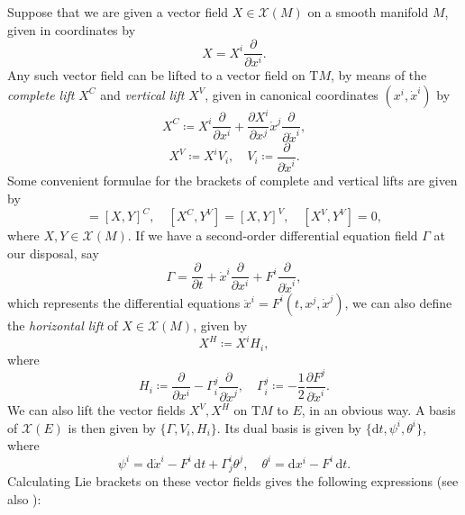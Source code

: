 \documentclass[11pt]{article}
\theoremstyle{plain}
\theoremstyle{definition}
\begin{document}
Suppose that we are given a vector field $X\in \mathcal{X}(M)$ on a smooth manifold $M$, given in coordinates by
\begin{equation*}
    X=X^i \frac{\partial}{\partial x^i}.
\end{equation*}
Any such vector field can be lifted to a vector field on $\mathrm{T}M$, by means of the \emph{complete lift} $X^C$ and \emph{vertical lift} $X^V$, given in canonical coordinates $(x^i,\dot{x}^i)$ by
\begin{equation*}
    X^C\coloneqq X^i \frac{\partial}{\partial x^i}+\frac{\partial X^i}{\partial x^j}\dot{x}^j\frac{\partial}{\partial \dot{x}^i},
\end{equation*}
\begin{equation*}
    X^V\coloneqq X^i V_i,\quad V_i\coloneqq \frac{\partial}{\partial \dot{x}^i}.
\end{equation*}
Some convenient formulae for the brackets of complete and vertical lifts are given by
\begin{equation*}
    [X^C,Y^C]=[X,Y]^C,\quad [X^C,Y^V]=[X,Y]^V,\quad [X^V,Y^V]=0,
\end{equation*}
where $X,Y\in \mathcal{X}(M)$. If we have a second-order differential equation field $\Gamma$ at our disposal, say
\begin{equation*}
    \Gamma=\frac{\partial}{\partial t}+\dot{x}^i \frac{\partial}{\partial x^i}+F^i \frac{\partial}{\partial \dot{x}^i},
\end{equation*}
which represents the differential equations $\ddot{x}^i=F^i(t,x^j,\dot{x}^j)$, we can also define the \emph{horizontal lift} of $X\in \mathcal{X}(M)$, given by
\begin{equation*}
    X^H\coloneqq X^i H_i,
\end{equation*}
where
\begin{equation*}
    H_i\coloneqq \frac{\partial}{\partial x^i}-\Gamma_i^j\frac{\partial}{\partial \dot{x}^j},\quad \Gamma_i^j\coloneqq -\frac{1}{2}\frac{\partial F^j}{\partial \dot{x}^i}.
\end{equation*}
We can also lift the vector fields $X^V, X^H$ on $\mathrm{T}M$ to $E$, in an obvious way. A basis of $\mathcal{X}(E)$ is then given by $\{\Gamma,V_i,H_i\}$. Its dual basis is given by $\{\mathrm{d}t,\psi^i,\theta^i\}$, where
\begin{equation*}
    \psi^i=\mathrm{d}\dot{x}^i-F^i\, \mathrm{d}t+\Gamma_j^i \theta^j,\quad \theta^i=\mathrm{d}x^i-F^i\, \mathrm{d}t.
\end{equation*}
Calculating Lie brackets on these vector fields gives the following expressions (see also \cite{crampin1984geohelmholtz,do2016invprob,krupkova2007jetbundles}):
\end{document}
